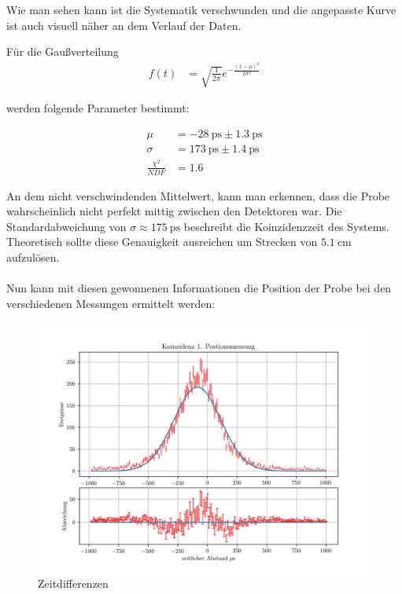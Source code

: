 \documentclass[12pt,twoside,a4paper]{scrartcl}
\begin{document}
					Wie man sehen kann ist die Systematik verschwunden und die angepasste Kurve ist auch visuell näher an dem Verlauf der Daten.

					Für die Gaußverteilung
					\begin{align*}
						f(t) &= \sqrt{\frac{1}{2 \pi}} e^{-\frac{(x-\mu)^2}{2 \sigma^2}}
					\end{align*}

					werden folgende Parameter bestimmt:

					\begin{align*}
						\mu &= \SI{-28}{\pico \second} \pm \SI{1.3}{\pico \second} \\
						\sigma &= \SI{173}{\pico \second} \pm \SI{1.4}{\pico \second} \\
						\frac{\chi^2}{NDF} &= 1.6
					\end{align*}

					An dem nicht verschwindenden Mittelwert, kann man erkennen, dass die Probe wahrscheinlich nicht perfekt mittig zwischen den Detektoren war.
					Die Standardabweichung von $\sigma \approx \SI{175}{\pico \second}$ beschreibt die Koinzidenzzeit des Systems. Theoretisch sollte diese Genauigkeit ausreichen um Strecken von $\SI{5.1}{\centi \metre}$ aufzulösen.
					 \\
					 \\

					 Nun kann mit diesen gewonnenen Informationen die Position der Probe bei den verschiedenen Messungen ermittelt werden:

					 \begin{figure}[H]
					 		\centering

								\includegraphics[width=\textwidth]{Plots/Time/1_Postionsmessung.png}

							\caption{Zeitdifferenzen}
					 \end{figure}
\end{document}
